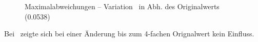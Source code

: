 \begin{figure}
	\caption{Maximalabweichungen -- Variation \Mceo\ in Abh. des Originalwerts (0.0538)}
	\label{fig:sysvarMc10m}
\end{figure}


Bei \Mczo\ zeigte sich bei einer Änderung bis zum 4-fachen Orignalwert kein Einfluss.


